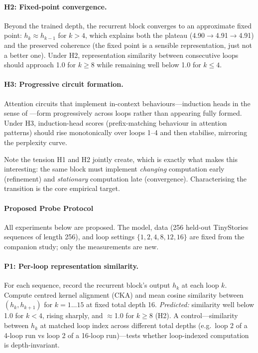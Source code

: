 \paragraph{H2: Fixed-point convergence.} Beyond the trained depth, the
recurrent block converges to an approximate fixed point:
$h_{k} \approx h_{k-1}$ for $k > 4$, which explains both the plateau
(4.90$\rightarrow$4.91$\rightarrow$4.91) and the preserved coherence
(the fixed point is a sensible representation, just not a better
one). Under H2, representation similarity between consecutive loops
should approach 1.0 for $k \geq 8$ while remaining well below 1.0 for
$k \leq 4$.

\paragraph{H3: Progressive circuit formation.} Attention circuits that
implement in-context behaviours---induction heads in the sense of
\citet{elhage2021mathematical}---form progressively across loops
rather than appearing fully formed. Under H3, induction-head scores
(prefix-matching behaviour in attention patterns) should rise
monotonically over loops 1--4 and then stabilise, mirroring the
perplexity curve.

Note the tension H1 and H2 jointly create, which is exactly what makes
this interesting: the same block must implement \emph{changing}
computation early (refinement) and \emph{stationary} computation late
(convergence). Characterising the transition is the core empirical
target.

\paragraph{Proposed Probe Protocol}

All experiments below are proposed. The model, data (256 held-out
TinyStories sequences of length 256), and loop settings
$\{1,2,4,8,12,16\}$ are fixed from the companion study; only the
measurements are new.

\paragraph{P1: Per-loop representation similarity.} For each sequence,
record the recurrent block's output $h_k$ at each loop $k$. Compute
centred kernel alignment (CKA) and mean cosine similarity between
$(h_k, h_{k+1})$ for $k = 1 \ldots 15$ at fixed total depth 16.
\emph{Predicted:} similarity well below 1.0 for $k < 4$, rising
sharply, and $\approx$1.0 for $k \geq 8$ (H2). A control---similarity
between $h_k$ at matched loop index across different total depths
(e.g.\ loop 2 of a 4-loop run vs loop 2 of a 16-loop run)---tests
whether loop-indexed computation is depth-invariant.

